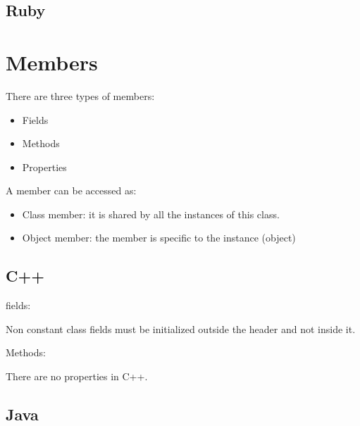 \documentclass{KodeBook}
\begin{document}
\subsection{Ruby}







\section{Members}

There are three types of members: 
\begin{itemize}
	\item Fields
	\item Methods
	\item Properties
\end{itemize}

A member can be accessed as: 
\begin{itemize}
	\item Class member: it is shared by all the instances of this class.
	\item Object member: the member is specific to the instance (object)
\end{itemize}


\subsection{C++}

fields: 


Non constant class fields must be initialized outside the header and not inside it. 

 

Methods:





There are no properties in C++.

\subsection{Java}
\end{document}
